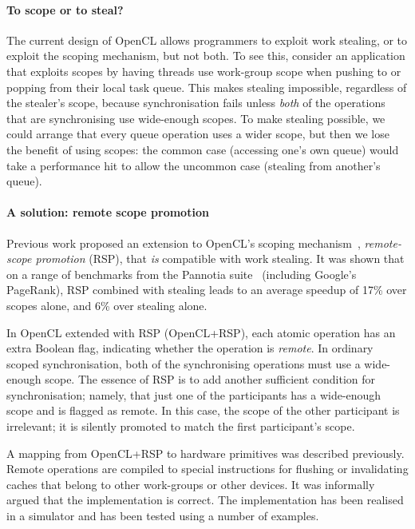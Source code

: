 \documentclass[svgnames,10pt]{sigplanconf}
\theoremstyle{definition}
\begin{document}
\paragraph{To scope or to steal?}
The current design of OpenCL allows programmers to exploit
work stealing, or to exploit the scoping mechanism, but not both. To
see this, consider an application that exploits scopes by having
threads use work-group scope when pushing to or popping from their
local task queue. This makes stealing impossible, regardless
of the stealer's scope, because synchronisation fails unless
\emph{both} of the operations that are synchronising use wide-enough
scopes. To make
stealing possible, we could arrange that every queue operation uses a
wider scope, but then we lose the benefit of using scopes: the common
case (accessing one's own queue) would take a performance hit to allow
the uncommon case (stealing from another's queue).

\paragraph{A solution: remote scope promotion}
Previous work proposed an extension to OpenCL's scoping mechanism~\cite{orr+15},
\emph{remote-scope promotion} (RSP), that \emph{is} compatible with
work stealing. It was shown that on a range of benchmarks from the Pannotia suite~\cite{che+13} (including Google's
PageRank), RSP combined with stealing leads to an average speedup of
17\% over scopes alone, and 6\% over stealing alone.

In OpenCL extended with RSP (OpenCL+RSP), each atomic
operation has an extra Boolean flag, indicating
whether the operation is \emph{remote}. In ordinary scoped
synchronisation, both of the synchronising operations must use
a wide-enough scope. The essence of RSP is to add another sufficient
condition for synchronisation; namely, that just one of the participants has a
wide-enough scope and is flagged as remote. In this case, the scope of
the other participant is irrelevant; it is silently promoted to match
the first participant's scope.

A mapping from OpenCL+RSP to hardware
primitives was described previously. Remote operations are compiled to special
instructions for flushing or invalidating caches that belong to other
work-groups or other devices. It was informally argued that the
implementation is correct. The implementation has been realised in a
simulator and has been tested using a number of examples.
\end{document}
